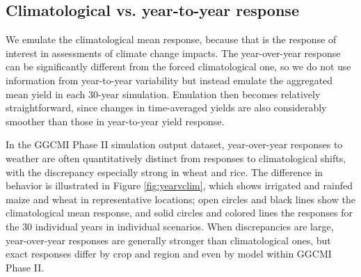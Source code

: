 \documentclass[gmd, manuscript]{copernicus} %
\begin{document}
\subsection{Climatological vs. year-to-year response}

We emulate the climatological mean response, because that is the response of interest in assessments of climate change impacts. 
The year-over-year response can be significantly different from the forced climatological one, so we do not use information from year-to-year variability but instead emulate the aggregated mean yield in each 30-year simulation. 
Emulation then becomes relatively straightforward, since changes in time-averaged yields are also considerably smoother than those in year-to-year yield response.

In the GGCMI Phase II simulation output dataset, year-over-year responses to weather are often quantitatively distinct from responses to climatological shifts, with the discrepancy especially strong in wheat and rice. 
The difference in behavior is illustrated in Figure \ref{fig:yearvclim}, which shows irrigated and rainfed maize and wheat in representative locations; open circles and black lines show the climatological mean response, and solid circles and colored lines the responses for the 30 individual years in individual scenarios.  
When discrepancies are large, year-over-year responses are generally stronger than climatological ones, but exact responses differ by crop and region and even by model within GGCMI Phase II. 
\end{document}
